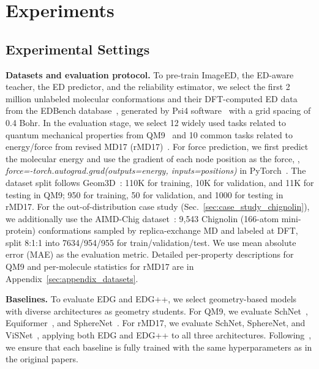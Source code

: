 \section{Experiments}
\label{sec:Experiments}

\subsection{Experimental Settings}

\textbf{Datasets and evaluation protocol.} To pre-train ImageED, the ED-aware teacher, the ED predictor, and the reliability estimator, we select the first 2 million unlabeled molecular conformations and their DFT-computed ED data from the EDBench database~\cite{xiang2025edbenchlargescaleelectrondensity}, generated by Psi4 software~\cite{turney2012psi4} with a grid spacing of 0.4 Bohr. In the evaluation stage, we select 12 widely used tasks related to quantum mechanical properties from QM9~\cite{ramakrishnan2014quantum} and 10 common tasks related to energy/force from revised MD17 (rMD17)~\cite{christensen2020role}. For force prediction, we first predict the molecular energy and use the gradient of each node position as the force, \ie, \textit{force=-torch.autograd.grad(outputs=energy, inputs=positions)} in PyTorch~\cite{paszke2019pytorch}. The dataset split follows Geom3D~\cite{liu2024symmetry}: 110K for training, 10K for validation, and 11K for testing in QM9; 950 for training, 50 for validation, and 1000 for testing in rMD17. For the out-of-distribution case study (Sec.~\ref{sec:case_study_chignolin}), we additionally use the AIMD-Chig dataset~\cite{wang2023aimdchig}: 9{,}543 Chignolin (166-atom mini-protein) conformations sampled by replica-exchange MD and labeled at DFT, split 8:1:1 into 7634/954/955 for train/validation/test. We use mean absolute error (MAE) as the evaluation metric. Detailed per-property descriptions for QM9 and per-molecule statistics for rMD17 are in Appendix~\ref{sec:appendix_datasets}.

\textbf{Baselines.} To evaluate EDG and EDG++, we select geometry-based models with diverse architectures as geometry students. For QM9, we evaluate SchNet~\cite{schutt2017schnet}, Equiformer~\cite{liao2023equiformer}, and SphereNet~\cite{liu2022spherical}. For rMD17, we evaluate SchNet, SphereNet, and ViSNet~\cite{wang2024enhancing}, applying both EDG and EDG++ to all three architectures. Following~\cite{liu2022spherical,wang2024enhancing,liu2024symmetry}, we ensure that each baseline is fully trained with the same hyperparameters as in the original papers.

